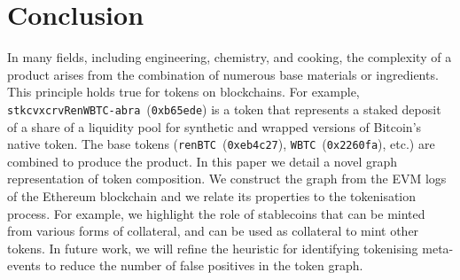 \section{Conclusion}\label{sec:conclusion}

In many fields, including engineering, chemistry, and cooking, the
complexity of a product arises from the combination of numerous base
materials or ingredients.  This principle holds true for tokens on
blockchains.  For example,
\texttt{stkcvxcrvRenWBTC-abra}~(\texttt{0xb65ede}) is a token that
represents a staked deposit of a share of a liquidity pool for
synthetic and wrapped versions of Bitcoin's native token.  The base
tokens (\texttt{renBTC}~(\texttt{0xeb4c27}),
\texttt{WBTC}~(\texttt{0x2260fa}), etc.) are combined to produce the
product.  In this paper we detail a novel graph representation of
token composition.  We construct the graph from the EVM logs of the
Ethereum blockchain and we relate its properties to the tokenisation
process.  For example, we highlight the role of stablecoins that can
be minted from various forms of collateral, and can be used as
collateral to mint other tokens.  In future work, we will refine the
heuristic for identifying tokenising meta-events to reduce the number
of false positives in the token graph.
